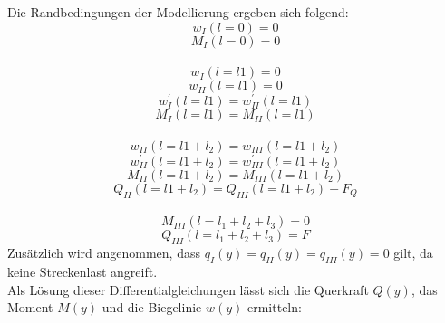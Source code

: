\noindent Die Randbedingungen der Modellierung ergeben sich folgend: 
\begin{equation}
	w_{I}(l=0)=0
\end{equation}
\begin{equation}
	M_{I}(l=0)=0
\end{equation}\\
\begin{equation}
	w_{I}(l=l{1}) = 0
\end{equation}
\begin{equation}
	w_{II}(l=l{1}) = 0
\end{equation}
\begin{equation}
	w_{I}^{'}(l=l{1}) = w_{II}^{'}(l=l{1})
\end{equation}
\begin{equation}
	M_{I}(l=l{1}) = M_{II}(l=l{1})
\end{equation}\\
\begin{equation}
	w_{II}(l=l{1}+l_{2}) = w_{III}(l=l{1}+l_{2})
\end{equation}
\begin{equation}
	w_{II}^{'}(l=l{1}+l_{2}) = w_{III}^{'}(l=l{1}+l_{2})
\end{equation}
\begin{equation}
	M_{II}(l=l{1}+l_{2}) = M_{III}(l=l{1}+l_{2})
\end{equation}
\begin{equation}
	Q_{II}(l=l{1}+l_{2}) = Q_{III}(l=l{1}+l_{2})+F_{Q}
\end{equation}\\
\begin{equation}
	M_{III}(l=l_{1}+l_{2}+l_{3})=0
\end{equation}
\begin{equation}
	Q_{III}(l=l_{1}+l_{2}+l_{3})=F
\end{equation}
Zusätzlich wird angenommen, dass $q_{I}(y)=q_{II}(y)=q_{III}(y)=0$ gilt, da keine Streckenlast angreift.\\

\noindent Als Lösung dieser Differentialgleichungen lässt sich die Querkraft $Q(y)$, das Moment $M(y)$ und die Biegelinie $w(y)$ ermitteln:\\

